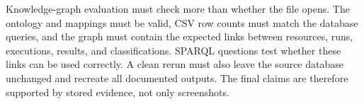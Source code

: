 Knowledge-graph evaluation must check more than whether the file opens. The ontology and mappings must be valid, CSV row counts must match the database queries, and the graph must contain the expected links between resources, runs, executions, results, and classifications. SPARQL questions test whether these links can be used correctly. A clean rerun must also leave the source database unchanged and recreate all documented outputs. The final claims are therefore supported by stored evidence, not only screenshots.
